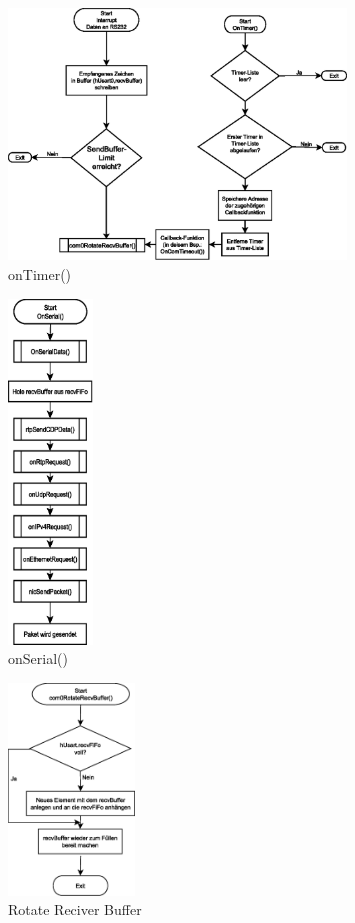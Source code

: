 \documentclass[a4paper]{book}%
\begin{document}
\begin{figure}[H]
	\centering
	\includegraphics[width=0.8\textwidth]{figures/ontimer.eps}
	\caption[onTimer()]{onTimer()}
	\label{fig:ontimer}
\end{figure}


\begin{figure}[H]
	\centering
	\includegraphics[width=0.2\textwidth]{figures/onserial.eps}
	\caption[onSerial()]{onSerial()}
	\label{fig:aonserial}
\end{figure}

\begin{figure}[H]
	\centering
	\includegraphics[width=0.3\textwidth]{figures/rotaterecvbuffer.eps}
	\caption[Rotate Reciver Buffer]{Rotate Reciver Buffer}
	\label{fig:rotaterecvbuffer}
\end{figure}
\end{document}
